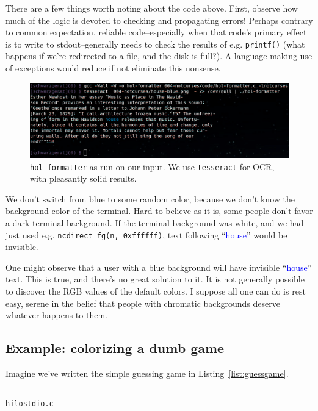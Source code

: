 \documentclass[letterpaper,10pt]{article}
\begin{document}
There are a few things worth noting about the code above. First, observe how
much of the logic is devoted to checking and propagating errors! Perhaps
contrary to common expectation, reliable code--especially when that code's
primary effect is to write to stdout--generally needs to check the results of
e.g. \texttt{printf()} (what happens if we're redirected to a file, and
the disk is full?). A language making use of exceptions would reduce if not
eliminate this nonsense.

\begin{figure}[!htbp]
\centering \includegraphics[width=.75\linewidth]{hol-formatted.png}
\caption{\texttt{hol-formatter} as run on our input. We use \texttt{tesseract} for OCR, with pleasantly solid results.}
\label{fig:houseout}
\end{figure}

We don't switch from blue to some random color, because we don't know the
background color of the terminal. Hard to believe as it is, some people don't
favor a dark terminal background. If the terminal background was white, and we
had just used e.g. \texttt{ncdirect\_fg(n, 0xffffff)}, text following
``\textcolor{blue}{house}'' would be invisible.

One might observe that a user with a blue background will have invisible
``\textcolor{blue}{house}'' text. This is true, and there's no great solution
to it. It is not generally possible to discover the RGB values of the default
colors. I suppose all one can do is rest easy, serene in the belief that people
with chromatic backgrounds deserve whatever happens to them.

\subsection{Example: colorizing a dumb game}

Imagine we've written the simple guessing game in Listing~\ref{list:guessgame}.

\begin{listing}[!htbp]
\inputminted[]{C}{code/hilostdio.c}
\caption{\texttt{hilostdio.c}}
\label{list:guessgame}
\end{listing}
\end{document}
